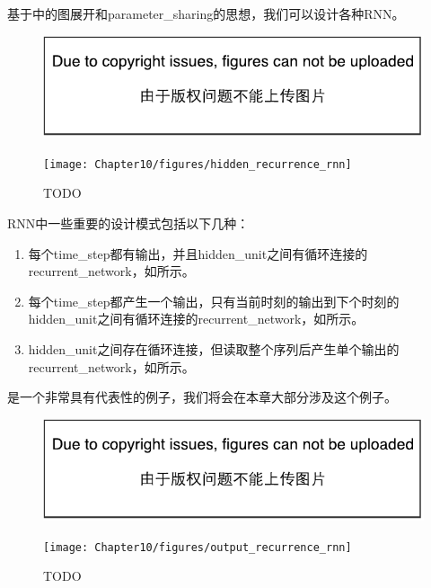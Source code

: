 \section{}
\label{sec:recurrent_neural_networks}
基于中的图展开和\gls{parameter_sharing}的思想，我们可以设计各种\gls{RNN}。
\begin{figure}[!htb]
\ifOpenSource
\centerline{\includegraphics{figure.pdf}}
\else
\centerline{\texttt{[image: Chapter10/figures/hidden\_recurrence\_rnn]}}
\fi
\caption{TODO}
\label{fig:chap10_hidden_recurrence_rnn}
\end{figure}
\gls{RNN}中一些重要的设计模式包括以下几种：
\begin{enumerate}
 \item 每个\gls{time_step}都有输出，并且\gls{hidden_unit}之间有循环连接的\gls{recurrent_network}，如所示。
 \item 每个\gls{time_step}都产生一个输出，只有当前时刻的输出到下个时刻的\gls{hidden_unit}之间有循环连接的\gls{recurrent_network}，如所示。
 \item \gls{hidden_unit}之间存在循环连接，但读取整个序列后产生单个输出的\gls{recurrent_network}，如所示。
\end{enumerate}
是一个非常具有代表性的例子，我们将会在本章大部分涉及这个例子。
\begin{figure}[!htb]
\ifOpenSource
\centerline{\includegraphics{figure.pdf}}
\else
\centerline{\texttt{[image: Chapter10/figures/output\_recurrence\_rnn]}}
\fi
\caption{TODO}
\label{fig:chap10_output_recurrence_rnn}
\end{figure}

